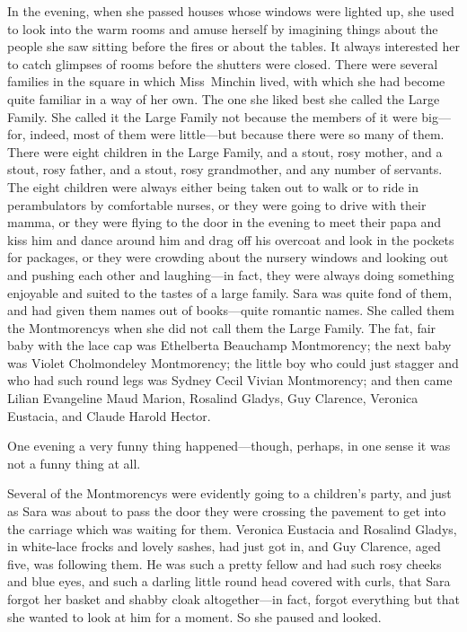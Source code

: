 In the evening, when she passed houses whose windows were lighted up, she used to look into the warm rooms and amuse herself by imagining things about the people she saw sitting before the fires or about the tables. It always interested her to catch glimpses of rooms before the shutters were closed. There were several families in the square in which Miss~Minchin lived, with which she had become quite familiar in a way of her own. The one she liked best she called the Large Family. She called it the Large Family not because the members of it were big—for, indeed, most of them were little—but because there were so many of them. There were eight children in the Large Family, and a stout, rosy mother, and a stout, rosy father, and a stout, rosy grandmother, and any number of servants. The eight children were always either being taken out to walk or to ride in perambulators by comfortable nurses, or they were going to drive with their mamma, or they were flying to the door in the evening to meet their papa and kiss him and dance around him and drag off his overcoat and look in the pockets for packages, or they were crowding about the nursery windows and looking out and pushing each other and laughing—in fact, they were always doing something enjoyable and suited to the tastes of a large family. Sara was quite fond of them, and had given them names out of books—quite romantic names. She called them the Montmorencys when she did not call them the Large Family. The fat, fair baby with the lace cap was Ethelberta Beauchamp Montmorency; the next baby was Violet Cholmondeley Montmorency; the little boy who could just stagger and who had such round legs was Sydney Cecil Vivian Montmorency; and then came Lilian Evangeline Maud Marion, Rosalind Gladys, Guy Clarence, Veronica Eustacia, and Claude Harold Hector.

One evening a very funny thing happened—though, perhaps, in one sense it was not a funny thing at all.

Several of the Montmorencys were evidently going to a children's party, and just as Sara was about to pass the door they were crossing the pavement to get into the carriage which was waiting for them. Veronica Eustacia and Rosalind Gladys, in white-lace frocks and lovely sashes, had just got in, and Guy Clarence, aged five, was following them. He was such a pretty fellow and had such rosy cheeks and blue eyes, and such a darling little round head covered with curls, that Sara forgot her basket and shabby cloak altogether—in fact, forgot everything but that she wanted to look at him for a moment. So she paused and looked.

